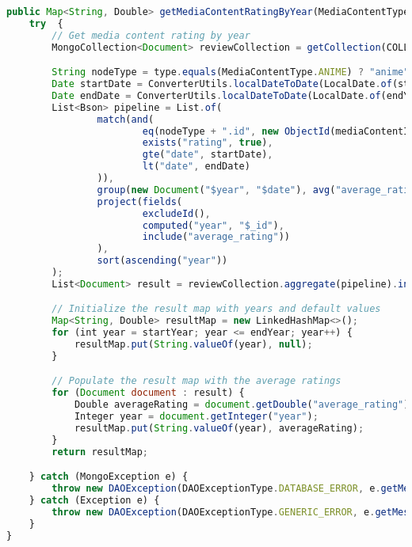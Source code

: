 \begin{lstlisting}[language=JavaScript]
public Map<String, Double> getMediaContentRatingByYear(MediaContentType type, String mediaContentId, int startYear, int endYear) throws  DAOException {
    try  {
        // Get media content rating by year
        MongoCollection<Document> reviewCollection = getCollection(COLLECTION_NAME);

        String nodeType = type.equals(MediaContentType.ANIME) ? "anime" : "manga";
        Date startDate = ConverterUtils.localDateToDate(LocalDate.of(startYear, 1, 1));
        Date endDate = ConverterUtils.localDateToDate(LocalDate.of(endYear + 1, 1, 1));
        List<Bson> pipeline = List.of(
                match(and(
                        eq(nodeType + ".id", new ObjectId(mediaContentId)),
                        exists("rating", true),
                        gte("date", startDate),
                        lt("date", endDate)
                )),
                group(new Document("$year", "$date"), avg("average_rating", "$rating")),
                project(fields(
                        excludeId(),
                        computed("year", "$_id"),
                        include("average_rating"))
                ),
                sort(ascending("year"))
        );
        List<Document> result = reviewCollection.aggregate(pipeline).into(new ArrayList<>());

        // Initialize the result map with years and default values
        Map<String, Double> resultMap = new LinkedHashMap<>();
        for (int year = startYear; year <= endYear; year++) {
            resultMap.put(String.valueOf(year), null);
        }

        // Populate the result map with the average ratings
        for (Document document : result) {
            Double averageRating = document.getDouble("average_rating");
            Integer year = document.getInteger("year");
            resultMap.put(String.valueOf(year), averageRating);
        }
        return resultMap;

    } catch (MongoException e) {
        throw new DAOException(DAOExceptionType.DATABASE_ERROR, e.getMessage());
    } catch (Exception e) {
        throw new DAOException(DAOExceptionType.GENERIC_ERROR, e.getMessage());
    }
}
\end{lstlisting}
    
